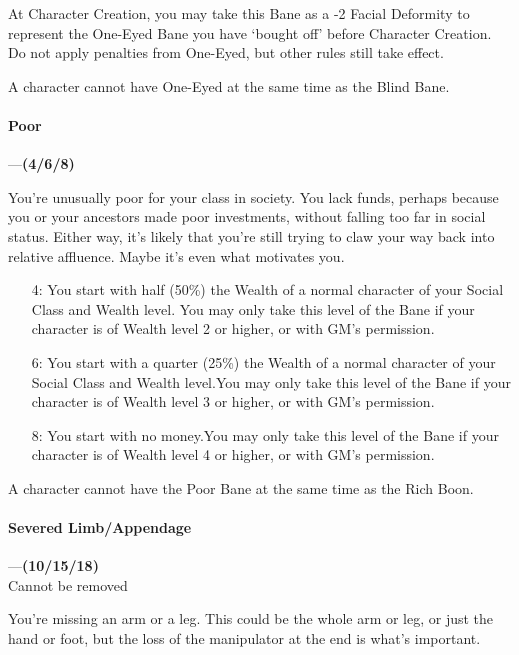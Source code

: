 \documentclass[oneside,11pt,english]{book}
\begin{document}
At Character Creation, you may take this Bane as a -2 Facial Deformity to represent the One-Eyed Bane you have ‘bought off’ before Character Creation. Do not apply penalties from One-Eyed, but other rules still take effect.


A character cannot have One-Eyed at the same time as the Blind Bane.
\paragraph{\label{bane:Poor}Poor}---\quad\textbf{(4/6/8) }\par
You're unusually poor for your class in society. You lack funds, perhaps because you or your ancestors made poor investments, without falling too far in social status. Either way, it's likely that you're still trying to claw your way back into relative affluence. Maybe it's even what motivates you.

\begin{itemize}
	\item [4:] You start with half (50\%) the Wealth of a normal character of your Social Class and Wealth level. You may only take this level of the Bane if your character is of Wealth level 2 or higher, or with GM's permission.
	\item [6:] You start with a quarter (25\%) the Wealth of a normal character of your Social Class and Wealth level.You may only take this level of the Bane if your character is of Wealth level 3 or higher, or with GM's permission.
	\item [8:] You start with no money.You may only take this level of the Bane if your character is of Wealth level 4 or higher, or with GM's permission.
\end{itemize}
A character cannot have the Poor Bane at the same time as the Rich Boon.
\paragraph{\label{bane:Severed Limb/Appendage}Severed Limb/Appendage}---\quad\textbf{(10/15/18) }\\
{Cannot be removed}\par
You're missing an arm or a leg. This could be the whole arm or leg, or just the hand or foot, but the loss of the manipulator at the end is what's important.
\end{document}
